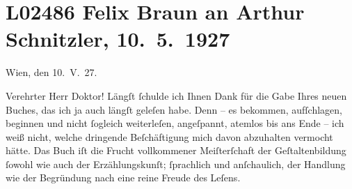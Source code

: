 

\section[Felix Braun an Arthur Schnitzler, 10. 5. 1927]{L02486 Felix Braun an Arthur Schnitzler, 10. 5. 1927}
\nopagebreak{}
\rehead{ }\normalsize\beginnumbering{}
\toendnotes[C]{\smallbreak\pagebreak[2]}
\toendnotes[C]{\smallbreak}
\pstart
           \centering{}{\pb}Wien, den 10. V. 27.\pend
           
\pstart{}Verehrter Herr Doktor!\pend\vspace{0.5em}
\pstart
           Längſt ſchulde ich Ihnen Dank für die Gabe Ihres neuen Buches, das ich ja auch längſt geleſen
               habe. Denn – es bekommen, aufſchlagen, beginnen und nicht ſogleich weiterleſen,
               angeſpannt, atemlos bis ans Ende – ich weiß nicht, welche dringende Beſchäftigung
               mich davon abzuhalten vermocht hätte. Das Buch iſt die Frucht vollkommener Meiſterſchaft der
               Geſtaltenbildung ſowohl wie auch der Erzählungskunſt; ſprachlich und anſchaulich, der
                  Hand{\pb}lung wie der
               Begründung nach eine reine Freude des Leſens.\pend
           
